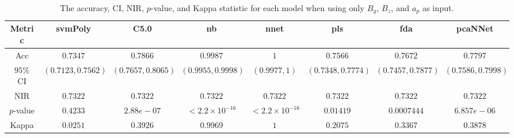 \begin{table}[!ht]
	\centering
	\begin{tabular}{|c|c|c|c|c|c|c|c|}
		\hline
		Metric & svmPoly & C5.0 & nb & nnet & pls & fda & pcaNNet \\ \hline
		Acc & $0.7347$ & $0.7866$ & $0.9987$ & $1$ & $0.7566$ & $0.7672$ & $0.7797$ \\ \hline
		$95\%$ CI & $(0.7123, 0.7562)$ & $(0.7657, 0.8065)$ & $(0.9955, 0.9998)$ & $(0.9977, 1)$ & $(0.7348, 0.7774)$ & $(0.7457, 0.7877)$ & $(0.7586, 0.7998)$ \\ \hline
		NIR & $0.7322$ & $0.7322$ & $0.7322$ & $0.7322$ & $0.7322$ & $0.7322$ & $0.7322$ \\ \hline
		$p$-value & $0.4233$ & $2.88e-07$ & $< 2.2 \times {10}^{-16}$ & $< 2.2 \times {10}^{-16}$ & $0.01419$ & $0.0007444$ & $6.857e-06$ \\ \hline
		Kappa & $0.0251$ & $0.3926$ & $0.9969$ & $1$ & $0.2075$ & $0.3367$ & $0.3878$ \\ \hline
	\end{tabular}
	\caption{The accuracy, CI, NIR, $p$-value, and Kappa statistic for each model when using only $B_{y}$, $B_{z}$, and $a_{p}$ as input.}
	\label{tab:stats:yzap}
\end{table}
